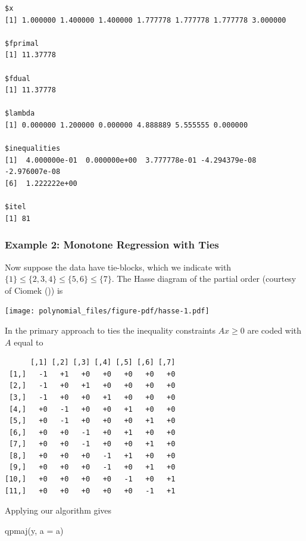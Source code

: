 \documentclass[
  12pt,
  letterpaper,
  DIV=11,
  numbers=noendperiod]{scrreprt}
\newenvironment{Shaded}{\begin{snugshade}}{\end{snugshade}}
\newcommand{\AttributeTok}[1]{\textcolor[rgb]{0.40,0.45,0.13}{#1}}
\newcommand{\FunctionTok}[1]{\textcolor[rgb]{0.28,0.35,0.67}{#1}}
\newcommand{\NormalTok}[1]{\textcolor[rgb]{0.00,0.23,0.31}{#1}}
\theoremstyle{remark}
\begin{document}
\begin{verbatim}
$x
[1] 1.000000 1.400000 1.400000 1.777778 1.777778 1.777778 3.000000

$fprimal
[1] 11.37778

$fdual
[1] 11.37778

$lambda
[1] 0.000000 1.200000 0.000000 4.888889 5.555555 0.000000

$inequalities
[1]  4.000000e-01  0.000000e+00  3.777778e-01 -4.294379e-08 -2.976007e-08
[6]  1.222222e+00

$itel
[1] 81
\end{verbatim}

\subsubsection{Example 2: Monotone Regression with
Ties}\label{example-2-monotone-regression-with-ties}

Now suppose the data have tie-blocks, which we indicate with
\(\{1\}\leq\{2,3,4\}\leq\{5,6\}\leq\{7\}\). The Hasse diagram of the
partial order (courtesy of Ciomek ()) is

\begin{center}
\texttt{[image: polynomial\_files/figure-pdf/hasse-1.pdf]}
\end{center}

In the primary approach to ties the inequality constraints \(Ax\geq 0\)
are coded with \(A\) equal to

\begin{verbatim}
      [,1] [,2] [,3] [,4] [,5] [,6] [,7]
 [1,]   -1   +1   +0   +0   +0   +0   +0
 [2,]   -1   +0   +1   +0   +0   +0   +0
 [3,]   -1   +0   +0   +1   +0   +0   +0
 [4,]   +0   -1   +0   +0   +1   +0   +0
 [5,]   +0   -1   +0   +0   +0   +1   +0
 [6,]   +0   +0   -1   +0   +1   +0   +0
 [7,]   +0   +0   -1   +0   +0   +1   +0
 [8,]   +0   +0   +0   -1   +1   +0   +0
 [9,]   +0   +0   +0   -1   +0   +1   +0
[10,]   +0   +0   +0   +0   -1   +0   +1
[11,]   +0   +0   +0   +0   +0   -1   +1
\end{verbatim}

Applying our algorithm gives

\begin{Shaded}
\begin{Highlighting}[]
\FunctionTok{qpmaj}\NormalTok{(y, }\AttributeTok{a =}\NormalTok{ a)}
\end{Highlighting}
\end{Shaded}
\end{document}
